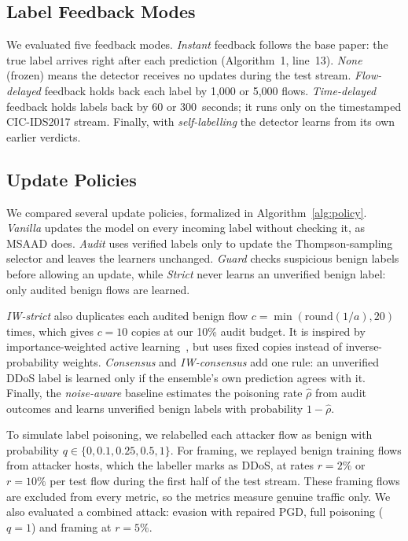 \documentclass[conference]{IEEEtran}
\begin{document}
\subsection{Label Feedback Modes}
We evaluated five feedback modes. \textit{Instant} feedback follows the base
paper: the true label arrives right after each prediction (Algorithm~1,
line~13). \textit{None} (frozen) means the detector receives no updates during
the test stream. \textit{Flow-delayed} feedback holds back each label by 1{,}000
or 5{,}000 flows. \textit{Time-delayed} feedback holds labels back by 60 or
300~seconds; it runs only on the timestamped CIC-IDS2017 stream. Finally, with
\textit{self-labelling} the detector learns from its own earlier verdicts.

\subsection{Update Policies}
We compared several update policies, formalized in
Algorithm~\ref{alg:policy}. \textit{Vanilla} updates the model on every
incoming label without checking it, as MSAAD does. \textit{Audit} uses verified
labels only to update the Thompson-sampling selector and leaves the learners
unchanged. \textit{Guard} checks suspicious benign labels before allowing an
update, while \textit{Strict} never learns an unverified benign label: only
audited benign flows are learned.

\textit{IW-strict} also duplicates each audited benign flow
$c = \min(\mathrm{round}(1/a), 20)$ times, which gives $c = 10$ copies at our
10\% audit budget. It is inspired by importance-weighted active
learning~\cite{beygelzimer2009iwal}, but uses fixed copies instead of
inverse-probability weights. \textit{Consensus} and \textit{IW-consensus} add
one rule: an unverified DDoS label is learned only if the ensemble's own
prediction agrees with it. Finally, the \textit{noise-aware} baseline estimates
the poisoning rate $\hat{\rho}$ from audit outcomes and learns unverified
benign labels with probability $1 - \hat{\rho}$.

To simulate label poisoning, we relabelled each attacker flow as benign with
probability $q \in \{0, 0.1, 0.25, 0.5, 1\}$. For framing, we replayed benign
training flows from attacker hosts, which the labeller marks as DDoS, at rates
$r = 2\%$ or $r = 10\%$ per test flow during the first half of the test stream.
These framing flows are excluded from every metric, so the metrics measure
genuine traffic only. We also evaluated a combined attack: evasion with repaired
PGD, full poisoning ($q = 1$) and framing at $r = 5\%$.
\end{document}
